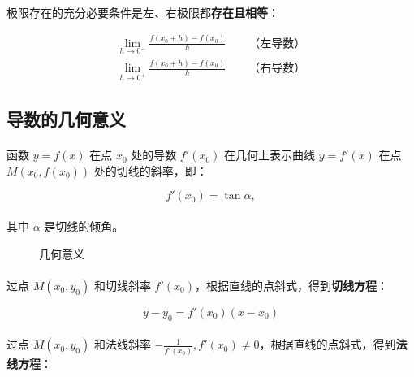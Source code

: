 \paragraph{}
极限存在的充分必要条件是左、右极限都\textbf{存在且相等}：

\begin{gather}
\lim_{h \to 0^-}\frac{f(x_0 + h) - f(x_0)}{h} \qquad \text{（左导数）} \\
\lim_{h \to 0^+}\frac{f(x_0 + h) - f(x_0)}{h} \qquad \text{（右导数）}
\end{gather}

\subsection{导数的几何意义}
\paragraph{}
函数 $y = f(x)$ 在点 $x_0$ 处的导数 $f'(x_0)$ 在几何上表示曲线 $y = f'(x)$ 在点 $M(x_0, f(x_0))$ 处的切线的斜率，即：

\begin{equation}
f'(x_0) = \tan \alpha ,
\end{equation}

\paragraph{}
其中 $\alpha$ 是切线的倾角。

\begin{figure}[H]
  \centering
    
    \caption{几何意义}
    \label{derivative_geometric_meaning}
\end{figure}

\paragraph{}
过点 $M(x_0, y_0)$ 和切线斜率 $f'(x_0)$，根据直线的点斜式，得到\textbf{切线方程}：

\begin{equation}
y - y_0 = f'(x_0)(x - x_0)
\end{equation}

\paragraph{}
过点 $M(x_0, y_0)$ 和法线斜率 $-\frac{1}{f'(x_0)}, f'(x_0) \neq 0$，根据直线的点斜式，得到\textbf{法线方程}：


